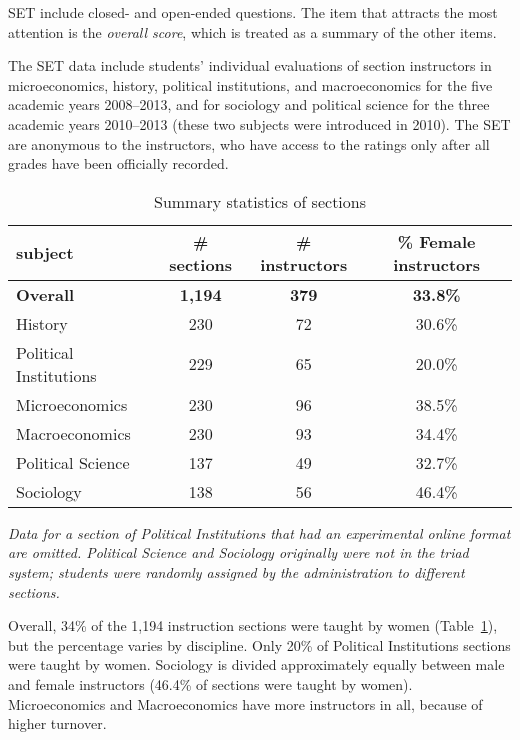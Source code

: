 \documentclass[12pt]{article}
\begin{document}
SET include closed- and open-ended questions.
The item that attracts the most attention is the \emph{overall score}, 
which is treated as a summary of the other items.

The SET data include students' individual evaluations of section
instructors in microeconomics, history, political institutions, and 
macroeconomics for the five academic years 2008--2013, and for 
sociology and political science for the three academic years 2010--2013 
(these two subjects were introduced in 2010). 
The SET are anonymous to the instructors, who have access to the ratings only after 
all grades have been officially recorded.  

\begin{table}[htbp]
  \centering
  \footnotesize 
  \caption{Summary statistics of sections}
    \begin{tabular}{lccc}
    \toprule 
    subject     & \# sections & \# instructors  & \% Female instructors  \\
   \midrule
  \textbf{Overall} &  \textbf{1,194} & \textbf{379}  &\textbf{33.8\%} \\
    History    &               230 &      72          &   30.6\% \\
    Political Institutions  &  229 &      65          &   20.0\% \\    
    Microeconomics   &         230 &      96          &   38.5\% \\
    Macroeconomics   &         230 &      93          &   34.4\% \\
    Political Science &       137 &      49          &   32.7\% \\
    Sociology   &              138 &      56          &   46.4\%    \\
    \bottomrule
    \end{tabular}%
 \label{tab:description}%
 
\textit{Data for a section of Political Institutions that 
had an experimental online format are omitted.
Political Science and Sociology originally were not in the triad system; 
students were randomly assigned by the administration to different sections.
} 

\end{table}%
\normalsize
Overall, 34\% of the 1,194 instruction sections were taught by women 
(Table~\ref{tab:description}), but the percentage varies by discipline. 
Only 20\% of Political Institutions sections were taught by women. 
Sociology is divided approximately equally between male and female instructors 
(46.4\% of sections were taught by women). 
Microeconomics and Macroeconomics have more instructors in all, because of higher turnover.
\end{document}
